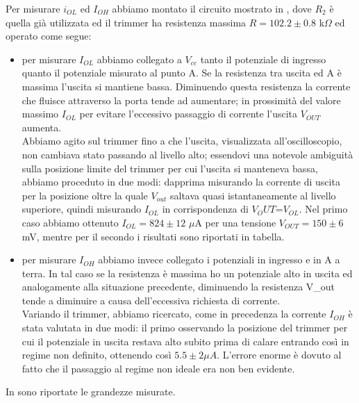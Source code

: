 Per misurare $i_{OL}$ ed $I_{OH}$ abbiamo montato il circuito mostrato in , dove $R_2$ è quella già utilizzata ed il trimmer ha resistenza massima $R = 102.2 \pm 0.8$ k$\Omega$ ed operato come segue:
\begin{itemize}
\item per misurare $I_{OL}$ abbiamo collegato a $V_{cc}$ tanto il potenziale di ingresso quanto il potenziale misurato al punto A. 
Se la resistenza tra uscita ed A è massima l'uscita si mantiene bassa. Diminuendo questa resistenza la corrente che fluisce attraverso la porta tende ad aumentare; in prossimità del valore massimo $I_{OL}$ per evitare l'eccessivo passaggio di corrente l'uscita $V_{OUT}$ aumenta.\\
 Abbiamo agito sul trimmer fino a che l'uscita, visualizzata all'oscilloscopio, non cambiava stato passando al livello alto; essendovi una notevole ambiguità sulla posizione limite del trimmer per cui l'uscita si manteneva bassa, abbiamo proceduto in due modi: dapprima misurando la corrente di uscita per la posizione oltre la quale $V_{out}$ saltava quasi istantaneamente al livello superiore, quindi misurando $I_{OL}$ in corrispondenza di $V_OUT$=$V_{OL}$. Nel primo caso abbiamo ottenuto $I_{OL} = 824 \pm 12$ $\mu$A per una tensione $V_{OUT}=150 \pm 6$ mV, mentre per il secondo i risultati sono riportati in tabella.
\item per misurare $I_{OH}$ abbiamo invece collegato i potenziali in ingresso e in A a terra. In tal caso se la resistenza è massima ho un potenziale alto in uscita ed analogamente alla situazione precedente, diminuendo la resistenza  V_{out} tende a diminuire a causa dell'eccessiva richiesta di corrente. \\
Variando il trimmer, abbiamo ricercato, come in precedenza la corrente $I_{OH}$ è stata valutata in due modi: il primo osservando la posizione del trimmer per cui il potenziale in uscita restava alto subito prima di calare entrando così in regime non definito, ottenendo così $5.5\pm 2 \mu A$. L'errore enorme è dovuto al fatto che il passaggio al regime non ideale era non ben evidente.
\end{itemize}
In  sono riportate le grandezze misurate.
